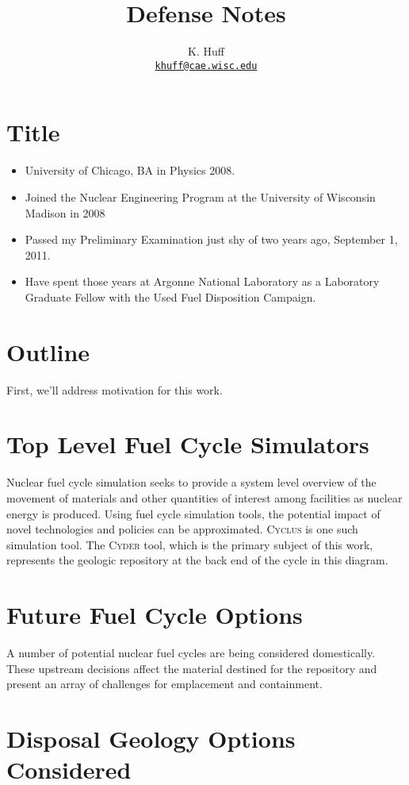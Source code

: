\documentclass[letterpaper]{article}
\author{K. Huff
\\ \href{mailto:khuff@cae.wisc.edu}{\texttt{khuff@cae.wisc.edu}}
}
\date{}
\title{Defense Notes}
\newcommand{\Cyder}{\textsc{Cyder}\xspace}
\newcommand{\Cyclus}{\textsc{Cyclus}\xspace}
\begin{document}
\maketitle

\section{Title}
\begin{itemize}
\item University of Chicago, BA in Physics 2008.
\item Joined the Nuclear Engineering Program at the University of Wisconsin Madison in 2008 
\item Passed my Preliminary Examination just shy of two years ago, September 1, 2011.
\item Have spent those years at Argonne National Laboratory as a Laboratory 
Graduate Fellow with the Used Fuel Disposition Campaign.
\end{itemize}
\section{Outline}

First, we'll address motivation for this work.

\section{Top Level Fuel Cycle Simulators}

Nuclear fuel cycle simulation seeks to provide a system level overview of the 
movement of materials and other quantities of interest among facilities as 
nuclear energy is produced. Using fuel cycle simulation tools, the potential 
impact of novel technologies and policies can be approximated. \Cyclus is one 
such simulation tool. The \Cyder tool, which is the primary subject of this 
work, represents the geologic repository at the back end of the cycle in this 
diagram.

\section{Future Fuel Cycle Options}

A number of potential nuclear fuel cycles are being considered domestically. 
These upstream decisions affect the material destined for the repository and 
present an array of challenges for emplacement and containment.

\section{Disposal Geology Options Considered}
\end{document}
